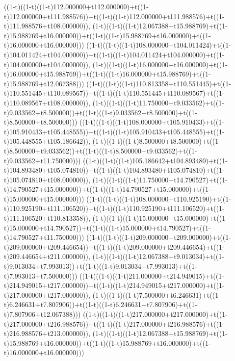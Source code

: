 ((1-t)((1-t)((1-t)112.000000+t112.000000)+t((1-t)112.000000+t111.988576))+t((1-t)((1-t)112.000000+t111.988576)+t((1-t)111.988576+t108.000000)),                                     (1-t)((1-t)((1-t)12.067388+t15.988769)+t((1-t)15.988769+t16.000000))+t((1-t)((1-t)15.988769+t16.000000)+t((1-t)16.000000+t16.000000)))
((1-t)((1-t)((1-t)108.000000+t104.011424)+t((1-t)104.011424+t104.000000))+t((1-t)((1-t)104.011424+t104.000000)+t((1-t)104.000000+t104.000000)),                                     (1-t)((1-t)((1-t)16.000000+t16.000000)+t((1-t)16.000000+t15.988769))+t((1-t)((1-t)16.000000+t15.988769)+t((1-t)15.988769+t12.067388)))
((1-t)((1-t)((1-t)110.813358+t110.551445)+t((1-t)110.551445+t110.089567))+t((1-t)((1-t)110.551445+t110.089567)+t((1-t)110.089567+t108.000000)),                                     (1-t)((1-t)((1-t)11.750000+t9.033562)+t((1-t)9.033562+t8.500000))+t((1-t)((1-t)9.033562+t8.500000)+t((1-t)8.500000+t8.500000)))
((1-t)((1-t)((1-t)108.000000+t105.910433)+t((1-t)105.910433+t105.448555))+t((1-t)((1-t)105.910433+t105.448555)+t((1-t)105.448555+t105.186642)),                                     (1-t)((1-t)((1-t)8.500000+t8.500000)+t((1-t)8.500000+t9.033562))+t((1-t)((1-t)8.500000+t9.033562)+t((1-t)9.033562+t11.750000)))
((1-t)((1-t)((1-t)105.186642+t104.893480)+t((1-t)104.893480+t105.074810))+t((1-t)((1-t)104.893480+t105.074810)+t((1-t)105.074810+t108.000000)),                                     (1-t)((1-t)((1-t)11.750000+t14.790527)+t((1-t)14.790527+t15.000000))+t((1-t)((1-t)14.790527+t15.000000)+t((1-t)15.000000+t15.000000)))
((1-t)((1-t)((1-t)108.000000+t110.925190)+t((1-t)110.925190+t111.106520))+t((1-t)((1-t)110.925190+t111.106520)+t((1-t)111.106520+t110.813358)),                                     (1-t)((1-t)((1-t)15.000000+t15.000000)+t((1-t)15.000000+t14.790527))+t((1-t)((1-t)15.000000+t14.790527)+t((1-t)14.790527+t11.750000)))
((1-t)((1-t)((1-t)209.000000+t209.000000)+t((1-t)209.000000+t209.446654))+t((1-t)((1-t)209.000000+t209.446654)+t((1-t)209.446654+t211.000000)),                                     (1-t)((1-t)((1-t)12.067388+t9.013034)+t((1-t)9.013034+t7.993013))+t((1-t)((1-t)9.013034+t7.993013)+t((1-t)7.993013+t7.500000)))
((1-t)((1-t)((1-t)211.000000+t214.949015)+t((1-t)214.949015+t217.000000))+t((1-t)((1-t)214.949015+t217.000000)+t((1-t)217.000000+t217.000000)),                                     (1-t)((1-t)((1-t)7.500000+t6.246631)+t((1-t)6.246631+t7.807906))+t((1-t)((1-t)6.246631+t7.807906)+t((1-t)7.807906+t12.067388)))
((1-t)((1-t)((1-t)217.000000+t217.000000)+t((1-t)217.000000+t216.988576))+t((1-t)((1-t)217.000000+t216.988576)+t((1-t)216.988576+t213.000000)),                                     (1-t)((1-t)((1-t)12.067388+t15.988769)+t((1-t)15.988769+t16.000000))+t((1-t)((1-t)15.988769+t16.000000)+t((1-t)16.000000+t16.000000)))
